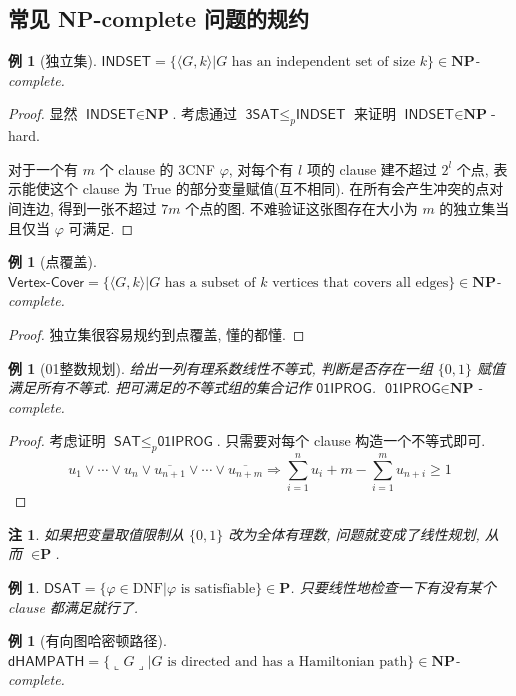 \documentclass[8pt]{article}
\theoremstyle{compact}
\newtheorem{example}[theorem]{例}
\newtheorem{remark}[theorem]{注}
\def\le{\leqslant}
\def\ge{\geqslant}
\def\rep#1{\llcorner{#1}\lrcorner}
\def\P{\textbf{P}}
\def\NP{\textbf{NP}}
\begin{document}
\subsection{常见 \NP-complete 问题的规约}
\begin{example}[独立集]
	$\textsf{INDSET} = \{\langle G, k \rangle | G \text{ has an independent set of size } k\} \in \NP$-complete.
\end{example}
\begin{proof}
	显然 $\textsf{INDSET} \in \NP$. 考虑通过 $\textsf{3SAT} \le_p \textsf{INDSET}$ 来证明 $\textsf{INDSET} \in \NP$-hard.

	对于一个有 $m$ 个 clause 的 3CNF $\varphi$, 对每个有 $l$ 项的 clause 建不超过 $2^l$ 个点, 表示能使这个 clause 为 True 的部分变量赋值(互不相同). 在所有会产生冲突的点对间连边, 得到一张不超过 $7m$ 个点的图. 不难验证这张图存在大小为 $m$ 的独立集当且仅当 $\varphi$ 可满足.
\end{proof}
\begin{example}[点覆盖]
	$\textsf{Vertex-Cover} = \{\langle G, k \rangle | G \text{ has a subset of } k \text{ vertices that covers all edges}\} \in \NP$-complete.
\end{example}
\begin{proof}
	独立集很容易规约到点覆盖, 懂的都懂.
\end{proof}
\begin{example}[01整数规划]
	给出一列有理系数线性不等式, 判断是否存在一组 $\{0, 1\}$ 赋值满足所有不等式. 把可满足的不等式组的集合记作 $\textsf{01IPROG}$. $\textsf{01IPROG} \in \NP$-complete.
\end{example}
\begin{proof}
	考虑证明 $\textsf{SAT} \le_p \textsf{01IPROG}$. 只需要对每个 clause 构造一个不等式即可.
	$$u_1 \vee \cdots \vee u_n \vee \overline{u_{n+1}} \vee \cdots \vee \overline{u_{n+m}} \Rightarrow \sum_{i=1}^{n}u_i + m - \sum_{i=1}^{m}u_{n+i} \ge 1$$
\end{proof}
\begin{remark}
	如果把变量取值限制从 $\{0, 1\}$ 改为全体有理数, 问题就变成了线性规划, 从而 $\in \P$.
\end{remark}
\begin{example}
	$\textsf{DSAT} = \{\varphi \in \text{DNF} | \varphi \text{ is satisfiable}\} \in \P$. 只要线性地检查一下有没有某个 clause 都满足就行了.
\end{example}
\begin{example}[有向图哈密顿路径]
	$\textsf{dHAMPATH} = \{\rep{G} | G \text{ is directed and has a Hamiltonian path}\} \in \NP$-complete.
\end{example}
\end{document}
